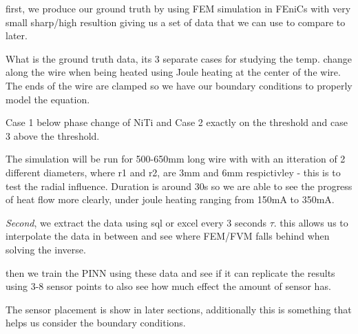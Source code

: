\documentclass[12pt, a4paper]{article}
\begin{document}
first, we produce our ground truth by using FEM simulation in FEniCs with very small sharp/high resultion giving us a set of data that we can use to compare to later. 

What is the ground truth data, its 3 separate cases for studying the temp. change along the wire when being heated using Joule heating at the center of the wire. The ends of the wire are clamped so we have our boundary conditions to properly model the equation. 

Case 1 below phase change of NiTi and Case 2 exactly on the threshold and case 3 above the threshold. 

The simulation will be run for 500-650mm long wire with with an itteration of 2 different diameters, where r1 and r2, are 3mm and 6mm  respictivley - this is to test the radial influence. Duration is around 30s so we are able to see the progress of heat flow more clearly, under joule heating ranging from 150mA to 350mA. 

\emph{Second}, we extract the data using sql or excel every 3 seconds $\tau$. this allows us to interpolate the data in between and see where FEM/FVM falls behind when solving the inverse.

then we train the PINN using these data and see if it can replicate the results using 3-8 sensor points to also see how much effect the amount of sensor has. 

The sensor placement is show in later sections, additionally this is something that helps us consider the boundary conditions. 
\end{document}
